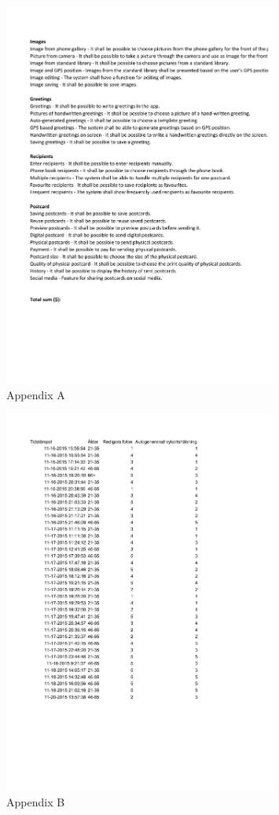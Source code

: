 \documentclass[10pt,a4paper]{article}
\begin{document}
\begin{figure}[h!]
\centering
\includegraphics[width=0.8\textwidth]{100Method.pdf}
\caption{Appendix A}
\label{app:A}
\end{figure}

\begin{figure}[h!]
\centering
\includegraphics[width=0.8\textwidth]{PostCardBuddyQuest.pdf}
\caption{Appendix B}
\label{app:B}
\end{figure}
\end{document}
